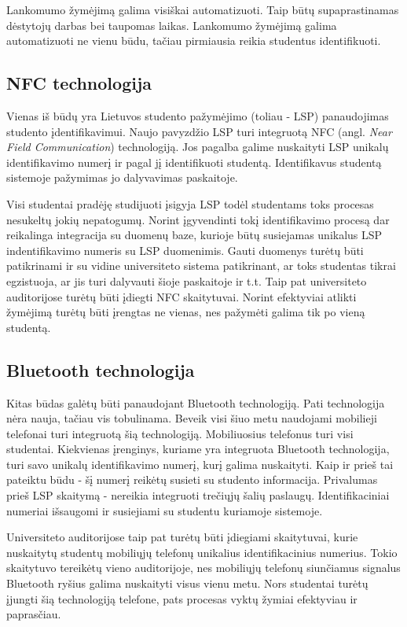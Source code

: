 \documentclass{VUMIFPSkursinis}
\begin{document}
Lankomumo žymėjimą galima visiškai automatizuoti. Taip būtų supaprastinamas dėstytojų darbas bei taupomas laikas. Lankomumo žymėjimą galima automatizuoti ne vienu būdu, tačiau pirmiausia reikia studentus identifikuoti.

\subsection{NFC technologija}
Vienas iš būdų yra Lietuvos studento pažymėjimo (toliau - LSP) panaudojimas studento įdentifikavimui. Naujo pavyzdžio LSP turi integruotą NFC (angl. \textit{Near Field Communication}) technologiją.  Jos pagalba galime nuskaityti LSP unikalų identifikavimo numerį ir pagal jį identifikuoti studentą. Identifikavus studentą sistemoje pažymimas jo dalyvavimas paskaitoje.

Visi studentai pradėję studijuoti įsigyja LSP todėl studentams toks procesas nesukeltų jokių nepatogumų. Norint įgyvendinti tokį identifikavimo procesą dar reikalinga integracija su duomenų baze, kurioje būtų susiejamas unikalus LSP indentifikavimo numeris su LSP duomenimis. Gauti duomenys turėtų būti patikrinami ir su vidine universiteto sistema patikrinant, ar toks studentas tikrai egzistuoja, ar jis turi dalyvauti šioje paskaitoje ir t.t. Taip pat universiteto auditorijose turėtų būti įdiegti NFC skaitytuvai. Norint efektyviai atlikti žymėjimą turėtų būti įrengtas ne vienas, nes pažymėti galima tik po vieną studentą.

\subsection{Bluetooth technologija}
Kitas būdas galėtų būti panaudojant Bluetooth technologiją. Pati technologija nėra nauja, tačiau vis tobulinama. Beveik visi šiuo metu naudojami mobilieji telefonai turi integruotą šią technologiją. Mobiliuosius telefonus turi visi studentai. Kiekvienas įrenginys, kuriame yra integruota Bluetooth technologija, turi savo unikalų identifikavimo numerį, kurį galima nuskaityti. Kaip ir prieš tai pateiktu būdu - šį numerį reikėtų susieti su studento informacija. Privalumas prieš LSP skaitymą - nereikia integruoti trečiųjų šalių paslaugų. Identifikaciniai numeriai išsaugomi ir susiejiami su studentu kuriamoje sistemoje.

Universiteto auditorijose taip pat turėtų būti įdiegiami skaitytuvai, kurie nuskaitytų studentų mobiliųjų telefonų unikalius identifikacinius numerius. Tokio skaitytuvo tereikėtų vieno auditorijoje, nes mobiliųjų telefonų siunčiamus signalus Bluetooth ryšius galima nuskaityti visus vienu metu. Nors studentai turėtų įjungti šią technologiją telefone, pats procesas vyktų žymiai efektyviau ir paprasčiau.
\end{document}
